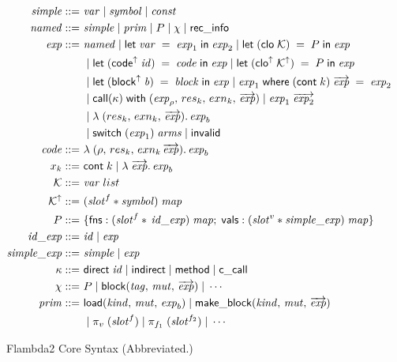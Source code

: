 \documentclass[11pt,fleqn]{amsart}
\begin{document}
\newcommand{\eval}[2]{\langle #1, \, #2\rangle}
\newcommand{\rebind}[3]{#1 \; [ #2 \mapsto #3 ]}

\begin{figure}[ht]
  \footnotesize
  \begin{align*}
    \mathit{simple} ::=~& \mathit{var} \; | \; \mathit{symbol} \; | \; \mathit{const} \\
    \mathit{named} ::=~& \mathit{simple} \; | \; \mathit{prim} \; | \; P \; | \; \chi \; | \; \mathsf{rec\_info} \\
    \mathit{exp} ::=~& \mathit{named} \; | \; \mathsf{let}\; \mathit{var} \; = \; \mathit{exp}_1 \; \mathsf{in} \; \mathit{exp}_2 \; | \; \mathsf{let}\; (\mathsf{clo} \; \mathcal{K}) \; = \; P \; \mathsf{in} \; \mathit{exp}\\
    & \; | \; \mathsf{let}\; (\mathsf{code}^{\uparrow} \; \mathit{id}) \; = \; \mathit{code} \; \mathsf{in} \; \mathit{exp} \; | \; \mathsf{let}\; (\mathsf{clo}^{\uparrow} \; \mathcal{K}^{\uparrow}) \; = \; P \; \mathsf{in} \; \mathit{exp} \\
    & \; | \; \mathsf{let}\; (\mathsf{block}^{\uparrow} \; \mathit{b}) \; = \; \mathit{block} \; \mathsf{in} \; \mathit{exp} \; | \; \mathit{exp}_1 \; \mathsf{where} \; (\mathsf{cont}\; k) \; \overrightarrow{\mathit{exp}} \; = \; \mathit{exp}_2 \\
    & \; | \; \mathsf{call}(\kappa) \; \mathsf{with} \; (\mathit{exp}_{\rho}, \, res_k, \, exn_k, \, \overrightarrow{\mathit{exp}}) \; | \; \mathit{exp}_1 \; \overrightarrow{\mathit{exp}_2} \\
    & \; | \; \lambda \; (res_k,\, exn_k,\, \overrightarrow{\mathit{exp}}).\, \mathit{exp}_b\\
    & \; | \; \mathsf{switch}\; (\mathit{exp}_1) \; \mathit{arms} \; | \; \mathsf{invalid} \\
    \mathit{code} ::=~& \lambda \; (\rho,\, res_k,\,exn_k\, \overrightarrow{\mathit{exp}}).\, \mathit{exp}_b \\
    x_k ::=~& \mathsf{cont}\; k \; | \; \lambda \; \overrightarrow{\mathit{exp}}.\, \mathit{exp}_b \\
    \mathcal{K} ::=~& \mathit{var} \; list \\
    \mathcal{K}^{\uparrow} ::=~& (\mathit{slot}^{f} \ast \mathit{symbol}) \; \mathit{map} \\
    P ::=~& \{ \mathsf{fns} : (\mathit{slot}^{f} \ast \, \mathit{id\_exp} ) \; \mathit{map} ; \;
    \mathsf{vals} : (\mathit{slot}^{v} \ast \mathit{simple\_exp}) \; \mathit{map} \}\\
    \mathit{id\_exp} ::=~& \mathit{id} \; | \; \mathit{exp} \\
    \mathit{simple\_exp} ::=~& \mathit{simple} \; | \; \mathit{exp} \\
    \kappa ::=~& \mathsf{direct} \; \mathit{id} \; | \; \mathsf{indirect} \; | \; \mathsf{method} \; | \; \mathsf{c\_call} \\
    \chi ::=~& P \; | \; \mathsf{block}(\mathit{tag},\,\mathit{mut},\,\overrightarrow{\mathit{exp}}) \; | \; \cdots \\
    \mathit{prim} ::=~& \mathsf{load}(\mathit{kind},\,\mathit{mut},\,\mathit{exp}_b) \; | \; \mathsf{make\_block}(\mathit{kind},\,\mathit{mut},\,\overrightarrow{\mathit{exp}}) \\
    & \; | \; \pi_{v} \; (\mathit{slot}^{f}) \; | \; \pi_{f_1} \; (\mathit{slot}^{f_2}) \; | \; \cdots
  \end{align*}
  \caption{Flambda2 Core Syntax (Abbreviated.) }
  \label{fig:syntax}
\end{figure}
\end{document}
